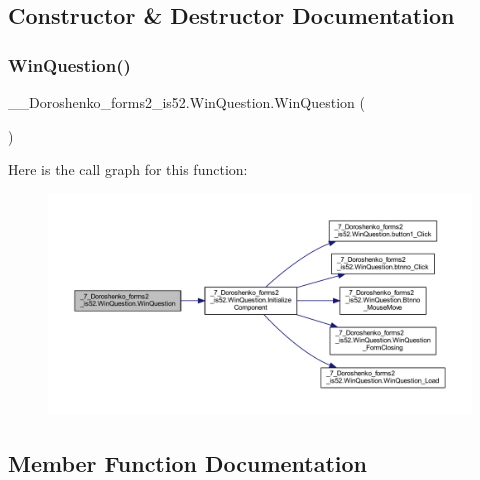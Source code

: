 \subsection{Constructor \& Destructor Documentation}
\hypertarget{class__7___doroshenko__forms2__is52_1_1_win_question_a0e982bdaeb60f44ace79f96fd3893fa0}{}\label{class__7___doroshenko__forms2__is52_1_1_win_question_a0e982bdaeb60f44ace79f96fd3893fa0} 
\subsubsection{\texorpdfstring{Win\+Question()}{WinQuestion()}}
{\footnotesize\ttfamily \+\_\+\_\+\+Doroshenko\+\_\+forms2\+\_\+is52.\+Win\+Question.\+Win\+Question (\begin{DoxyParamCaption}{ }\end{DoxyParamCaption})}

Here is the call graph for this function\+:
\nopagebreak
\begin{figure}[H]
\begin{center}
\leavevmode
\includegraphics[width=350pt]{class__7___doroshenko__forms2__is52_1_1_win_question_a0e982bdaeb60f44ace79f96fd3893fa0_cgraph}
\end{center}
\end{figure}


\subsection{Member Function Documentation}
\hypertarget{class__7___doroshenko__forms2__is52_1_1_win_question_addf298ada9a525f8c97dbb9f930d6719}{}\label{class__7___doroshenko__forms2__is52_1_1_win_question_addf298ada9a525f8c97dbb9f930d6719} 

